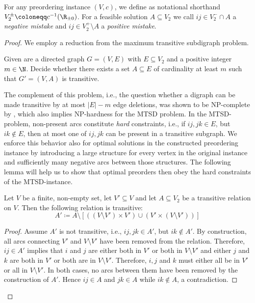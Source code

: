 For any preordering instance $(V, c)$, we define as notational shorthand $V_{2}^{\pm} \coloneqq c^{-1}(\R_{\pm 0})$.
For a feasible solution $A \subseteq V_{2}$ we call $ij \in V_{2}^{-} \cap A$ a \emph{negative mistake} and $ij \in V_{2}^{+} \setminus A$ a \emph{positive mistake}.
\begin{proof}
	We employ a reduction from the maximum transitive subdigraph problem.
	
	\begin{definition}
		Given are a directed graph $G = (V, E)$ with $E \subseteq V_{2}$ and a positive integer $m \in \N$.
		Decide whether there exists a set $A \subseteq E$ of cardinality at least $m$ such that $G' = (V, A)$ is transitive.
	\end{definition}
	
	The complement of this problem, i.e., the question whether a digraph can be made transitive by at most $\lvert E \rvert - m$ edge deletions, was shown to be \textsc{NP}-complete by \cite{yannakakisEdgeDeletionProblems1981},
	which also implies \textsc{NP}-hardness for the \textsc{MTSD} problem.
	In the \textsc{MTSD}-problem, non-present arcs constitute \emph{hard} constraints, i.e., if $ij, jk \in E$, but $ik \notin E$, then at most one of $ij, jk$ can be present in a transitive subgraph.
	We enforce this behavior also for optimal solutions in the constructed preordering instance by introducing a large structure for every vertex in the original instance and sufficiently many negative arcs between those structures.
	The following lemma will help us to show that optimal preorders then obey the hard constraints of the \textsc{MTSD}-instance.
	
	\begin{lemma}\label{lem:isolating_set_from_preorder}
		Let $V$ be a finite, non-empty set, let $V' \subseteq V$ and let $A \subseteq V_{2}$ be a transitive relation on $V$.
		Then the following relation is transitive:
		\[
			A' \coloneqq A \setminus \left[ \left( (V \setminus V') \times V' \right) \cup \left( V' \times (V \setminus V') \right) \right]
		\]%
	\end{lemma}
	
	\begin{proof}
		Assume $A'$ is not transitive, i.e., $ij, jk \in A'$, but $ik \notin A'$.
		By construction, all arcs connecting $V'$ and $V \setminus V'$ have been removed from the relation.
		Therefore, $ij \in A'$ implies that $i$ and $j$ are either both in $V'$ or both in $V \setminus V'$ and either $j$ and $k$ are both in $V'$ or both are in $V \setminus V'$.
		Therefore, $i, j$ and $k$ must either all be in $V'$ or all in $V \setminus V'$.
		In both cases, no arcs between them have been removed by the construction of $A'$.
		Hence $ij \in A$ and $jk \in A$ while $ik \notin A$, a contradiction.
		\renewcommand{\qedsymbol}{$\blacksquare$}%
	\end{proof}
	

\end{proof}
